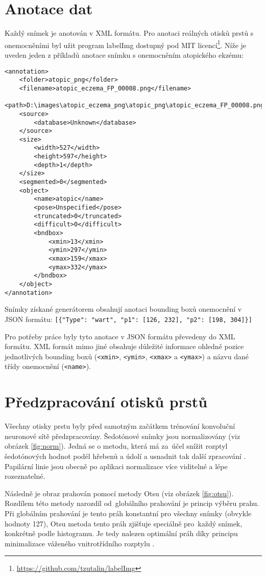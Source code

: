 \section{Anotace dat}
Každý snímek je anotován v XML formátu. Pro anotaci reálných otisků prstů s onemocněními byl užit program labelImg dostupný pod MIT licencí\footnote{\url{https://github.com/tzutalin/labelImg}}. Níže je uveden jeden z příkladů anotace snímku s onemocněním atopického ekzému:

\begin{verbatim}
<annotation>
    <folder>atopic_png</folder>
    <filename>atopic_eczema_FP_00008.png</filename>
    <path>D:\images\atopic_eczema_png\atopic_png\atopic_eczema_FP_00008.png</path>
    <source>
        <database>Unknown</database>
    </source>
    <size>
        <width>527</width>
        <height>597</height>
        <depth>1</depth>
    </size>
    <segmented>0</segmented>
    <object>
        <name>atopic</name>
        <pose>Unspecified</pose>
        <truncated>0</truncated>
        <difficult>0</difficult>
        <bndbox>
            <xmin>13</xmin>
            <ymin>297</ymin>
            <xmax>159</xmax>
            <ymax>332</ymax>
        </bndbox>
    </object>
</annotation>
\end{verbatim}
Snímky získané generátorem obsahují anotaci bounding boxů onemocnění v JSON formátu:
\verb=[{"Type": "wart", "p1": [126, 232], "p2": [198, 304]}]=

Pro potřeby práce byly tyto anotace v JSON formátu převedeny do XML formátu. XML formát mimo jiné obsahuje důležité informace ohledně pozice jednotlivých bounding boxů (\verb=<xmin>=, \verb=<ymin>=, \verb=<xmax>= a \verb=<ymax>=) a názvu dané třídy onemocnění (\verb=<name>=). 





\section{Předzpracování otisků prstů}
Všechny otisky prstu byly před samotným začátkem trénování konvoluční neuronové sítě předzpracovány. Šedotónové snímky jsou normalizovány (viz obrázek \ref{fig:norm}). Jedná se o metodu, která má za~účel snížit rozptyl šedotónových hodnot podél hřebenů a údolí a usnadnit tak další zpracování \cite{FingerprintImageEnhancement}. Papilární linie jsou obecně po aplikaci normalizace více viditelné a lépe rozeznatelné.

Následně je obraz prahován pomocí metody Otsu (viz obrázek \ref{fig:otsu}). Rozdílem této metody narozdíl od~globálního prahování je princip výběru prahu. Při globálním prahování je tento práh konstantní pro všechny snímky (obvykle hodnoty 127), Otsu metoda tento práh zjišťuje speciálně pro~každý snímek, konkrétně podle histogramu. Je tedy nalezen optimální práh díky principu minimalizace váženého vnitrotřídního rozptylu \cite{ImageThresholding}.

